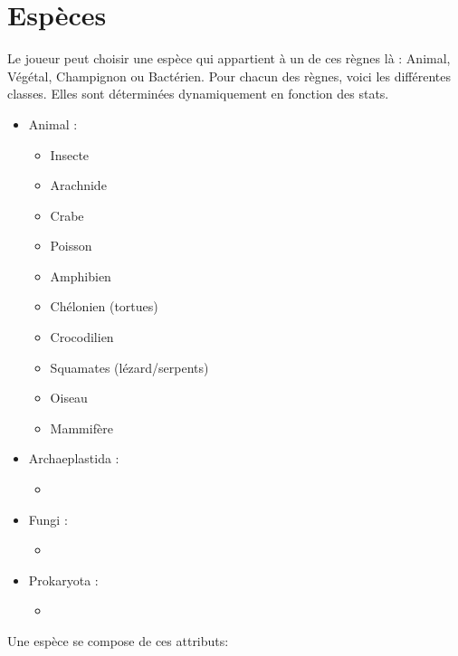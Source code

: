 \section{Espèces}
Le joueur peut choisir une espèce qui appartient à un de ces règnes là : Animal, Végétal, Champignon ou Bactérien. Pour chacun des règnes, voici les différentes classes. Elles sont déterminées dynamiquement en fonction des stats.
\begin{itemize}
	\item Animal :\begin{itemize}
				\item Insecte
				\item Arachnide
				\item Crabe
				\item Poisson
				\item Amphibien
				\item Chélonien (tortues)
				\item Crocodilien
				\item Squamates (lézard/serpents)
				\item Oiseau
				\item Mammifère
			\end{itemize}
	\item Archaeplastida :\begin{itemize}
				\item 
			\end{itemize}
	\item Fungi :\begin{itemize}
				\item 
			\end{itemize}
	\item Prokaryota :\begin{itemize}
				\item 
			\end{itemize}
\end{itemize}
Une espèce se compose de ces attributs:

